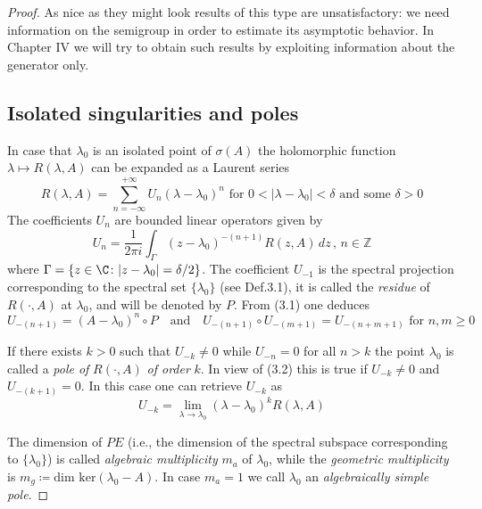 \begin{proof}
As nice as they might look results of this type are unsatisfactory: we need information on the semigroup in order to estimate its asymptotic behavior.
In Chapter IV we will try to obtain such results by exploiting information about the generator only.

\subsection{Isolated singularities and poles}\label{subsec:a3-3.6}

In case that $\lambda_{0}$ is an isolated point of $\sigma(A)$ the holomorphic function $\lambda \mapsto R(\lambda,A)$ can be expanded as a Laurent series
\[
R(\lambda,A) = \sum_{n=-\infty}^{+\infty} U_{n}(\lambda - \lambda_{0})^{n} \text{ for } 0 < |\lambda - \lambda_{0}| < \delta \text{ and some } \delta > 0
\]
The coefficients $U_{n}$ are bounded linear operators given by
\begin{equation}\label{eq:a3-3.1}
U_{n} = \frac{1}{2\pi i}\int_{\Gamma} (z - \lambda_{0})^{-(n+1)}R(z,A) \, dz \, , \, n \in \mathbb{Z}
\end{equation}
where $\Gamma = \{z \in \C \colon |z - \lambda_{0}| = \delta/2\}$.
The coefficient $U_{-1}$ is the spectral projection corresponding to the spectral set $\{\lambda_{0}\}$ (see Def.3.1), it is called the \emph{residue} of $R(\cdot,A)$ at $\lambda_{0}$, and will be denoted by $P$.
From (3.1) one deduces
\begin{equation}\label{eq:a3-3.2}
U_{-(n+1)} = (A - \lambda_{0})^{n} \circ P \quad \text{and} \quad U_{-(n+1)} \circ U_{-(m+1)} = U_{-(n+m+1)} \text{ for } n, m \geq 0
\end{equation}


\newpage
If there exists $k > 0$ such that $U_{-k} \neq 0$ while $U_{-n} = 0$ for all $n > k$ the point $\lambda_{0}$ is called a \emph{pole of} $R(\cdot,A)$ \emph{of order} $k$.
In view of (3.2) this is true if $U_{-k} \neq 0$ and $U_{-(k+1)} = 0$.
In this case one can retrieve $U_{-k}$ as
\begin{equation}\label{eq:a3-3.3}
U_{-k} = \lim_{\lambda \to \lambda_{0}} (\lambda - \lambda_{0})^{k}R(\lambda,A)
\end{equation}

The dimension of $PE$ (i.e., the dimension of the spectral subspace corresponding to $\{\lambda_{0}\}$) is called \emph{algebraic multiplicity} $m_{a}$ of $\lambda_{0}$, while the \emph{geometric multiplicity} is $m_{g} \coloneqq \text{dim ker}(\lambda_{0} - A)$.
In case $m_{a} = 1$ we call $\lambda_{0}$ an \emph{algebraically simple pole}.


\end{proof}
